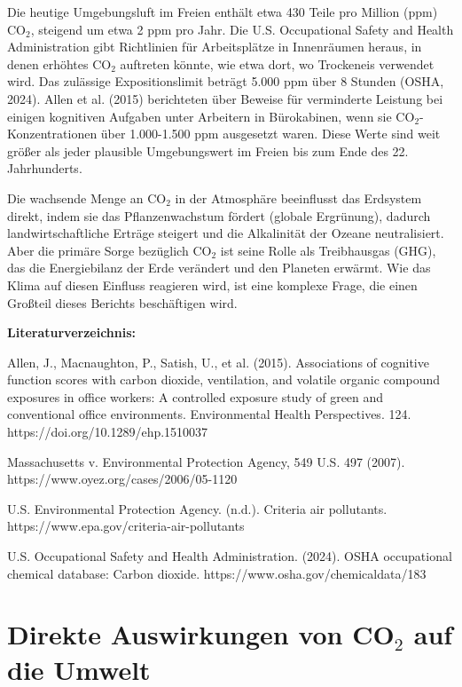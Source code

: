 \documentclass[12pt,paper=a4,DIV=12,parskip=never,chapterprefix=false,headings=standardclasses]{scrreprt}
\begin{document}
Die heutige Umgebungsluft im Freien enthält etwa 430 Teile pro Million (ppm) CO$_2$, steigend um etwa 2 ppm pro Jahr. Die U.S. Occupational Safety and Health Administration gibt Richtlinien für Arbeitsplätze in Innenräumen heraus, in denen erhöhtes CO$_2$ auftreten könnte, wie etwa dort, wo Trockeneis verwendet wird. Das zulässige Expositionslimit beträgt 5.000 ppm über 8 Stunden (OSHA, 2024). Allen et al. (2015) berichteten über Beweise für verminderte Leistung bei einigen kognitiven Aufgaben unter Arbeitern in Bürokabinen, wenn sie CO$_2$-Konzentrationen über 1.000-1.500 ppm ausgesetzt waren. Diese Werte sind weit größer als jeder plausible Umgebungswert im Freien bis zum Ende des 22. Jahrhunderts.

Die wachsende Menge an CO$_2$ in der Atmosphäre beeinflusst das Erdsystem direkt, indem sie das Pflanzenwachstum fördert (globale Ergrünung), dadurch landwirtschaftliche Erträge steigert und die Alkalinität der Ozeane neutralisiert. Aber die primäre Sorge bezüglich CO$_2$ ist seine Rolle als Treibhausgas (GHG), das die Energiebilanz der Erde verändert und den Planeten erwärmt. Wie das Klima auf diesen Einfluss reagieren wird, ist eine komplexe Frage, die einen Großteil dieses Berichts beschäftigen wird.

\vfill
\noindent\textbf{Literaturverzeichnis:}

\begingroup
\parindent=0pt
\everypar{\hangindent=2em\hangafter=1\relax}

Allen, J., Macnaughton, P., Satish, U., et al. (2015). Associations of cognitive function scores with carbon dioxide, ventilation, and volatile organic compound exposures in office workers: A controlled exposure study of green and conventional office environments. Environmental Health Perspectives. 124. https://doi.org/10.1289/ehp.1510037

Massachusetts v. Environmental Protection Agency, 549 U.S. 497 (2007).\\ https://www.oyez.org/cases/2006/05-1120

U.S. Environmental Protection Agency. (n.d.). Criteria air pollutants.\\ https://www.epa.gov/criteria-air-pollutants

U.S. Occupational Safety and Health Administration. (2024). OSHA occupational chemical database: Carbon dioxide. https://www.osha.gov/chemicaldata/183
\endgroup

\chapter{Direkte Auswirkungen von CO$_2$ auf die Umwelt}
\end{document}
